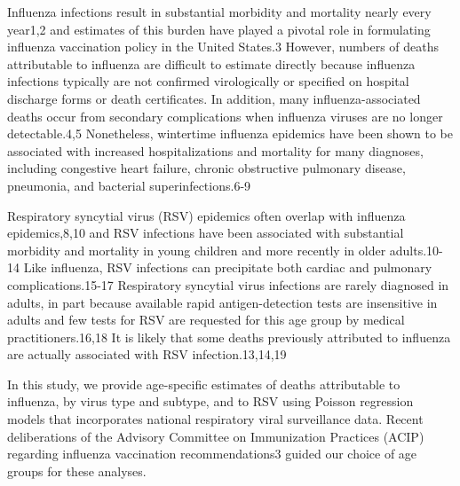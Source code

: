 Influenza infections result in substantial morbidity and mortality nearly every
year1,2 and estimates of this burden have played a pivotal role in formulating
influenza vaccination policy in the United States.3 However, numbers of deaths
attributable to influenza are difficult to estimate directly because influenza
infections typically are not confirmed virologically or specified on hospital
discharge forms or death certificates. In addition, many influenza-associated
deaths occur from secondary complications when influenza viruses are no longer
detectable.4,5 Nonetheless, wintertime influenza epidemics have been shown to
be associated with increased hospitalizations and mortality for many diagnoses,
including congestive heart failure, chronic obstructive pulmonary disease,
pneumonia, and bacterial superinfections.6-9

Respiratory syncytial virus (RSV) epidemics often overlap with influenza
epidemics,8,10 and RSV infections have been associated with substantial
morbidity and mortality in young children and more recently in older
adults.10-14 Like influenza, RSV infections can precipitate both cardiac and
pulmonary complications.15-17 Respiratory syncytial virus infections are rarely
diagnosed in adults, in part because available rapid antigen-detection tests
are insensitive in adults and few tests for RSV are requested for this age
group by medical practitioners.16,18 It is likely that some deaths previously
attributed to influenza are actually associated with RSV infection.13,14,19

In this study, we provide age-specific estimates of deaths attributable to
influenza, by virus type and subtype, and to RSV using Poisson regression
models that incorporates national respiratory viral surveillance data. Recent
deliberations of the Advisory Committee on Immunization Practices (ACIP)
regarding influenza vaccination recommendations3 guided our choice of age
groups for these analyses.

